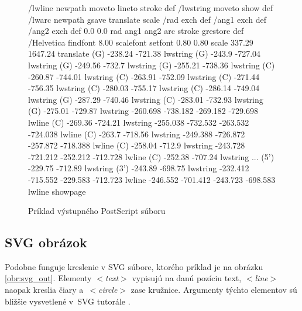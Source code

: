 \begin{figure}
\begin{code}[fontsize=\scriptsize, frame=none, samepage=true]
/lwline {newpath moveto lineto stroke} def
/lwstring {moveto show} def
/lwarc {newpath gsave translate scale /rad exch def /ang1 exch def
  /ang2 exch def 0.0 0.0 rad ang1 ang2 arc stroke grestore} def
/Helvetica findfont 8.00 scalefont setfont
0.80 0.80 scale
337.29 1647.24 translate
(G)            -238.24        -721.38        lwstring       
(G)            -243.9         -727.04        lwstring       
(G)            -249.56        -732.7         lwstring       
(G)            -255.21        -738.36        lwstring       
(C)            -260.87        -744.01        lwstring       
(C)            -263.91        -752.09        lwstring       
(C)            -271.44        -756.35        lwstring       
(C)            -280.03        -755.17        lwstring       
(C)            -286.14        -749.04        lwstring       
(G)            -287.29        -740.46        lwstring       
(C)            -283.01        -732.93        lwstring       
(G)            -275.01        -729.87        lwstring       
-260.698       -738.182       -269.182       -729.698        lwline
(C)            -269.36        -724.21        lwstring       
-255.038       -732.532       -263.532       -724.038        lwline
(C)            -263.7         -718.56        lwstring       
-249.388       -726.872       -257.872       -718.388        lwline
(C)            -258.04        -712.9         lwstring       
-243.728       -721.212       -252.212       -712.728        lwline
(C)            -252.38        -707.24        lwstring       
  ...
(5')           -229.75        -712.89        lwstring
(3')           -243.89        -698.75        lwstring
-232.412       -715.552       -229.583       -712.723        lwline
-246.552       -701.412       -243.723       -698.583        lwline
showpage
\end{code}
\caption{Príklad výstupného PostScript súboru}
\label{obr:ps_out}
\end{figure}



\newcommand{\tagt}[1]{\mbox{$<$\textit{#1}$>$}}

\subsection{SVG obrázok}

Podobne funguje kreslenie v SVG súbore, ktorého príklad je na obrázku \ref{obr:svg_out}.
Elementy \tagt{text} vypisujú na danú pozíciu text, \tagt{line}
naopak kreslia čiary a~\tagt{circle} zase kružnice.
Argumenty týchto elementov sú bližšie vysvetlené v~SVG tutorále .


